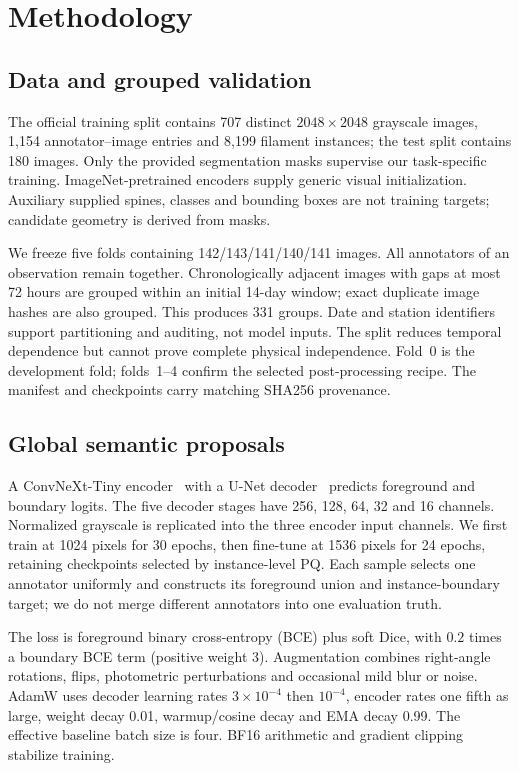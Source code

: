 \documentclass[sigconf]{acmart}
\begin{document}
\section{Methodology}\label{sec:methodology}
\subsection{Data and grouped validation}
The official training split contains 707 distinct $2048\!\times\!2048$ grayscale images, 1,154 annotator--image entries and 8,199 filament instances; the test split contains 180 images. Only the provided segmentation masks supervise our task-specific training. ImageNet-pretrained encoders supply generic visual initialization. Auxiliary supplied spines, classes and bounding boxes are not training targets; candidate geometry is derived from masks.

We freeze five folds containing 142/143/141/140/141 images. All annotators of an observation remain together. Chronologically adjacent images with gaps at most 72 hours are grouped within an initial 14-day window; exact duplicate image hashes are also grouped. This produces 331 groups. Date and station identifiers support partitioning and auditing, not model inputs. The split reduces temporal dependence but cannot prove complete physical independence. Fold~0 is the development fold; folds~1--4 confirm the selected post-processing recipe. The manifest and checkpoints carry matching SHA256 provenance.

\subsection{Global semantic proposals}
A ConvNeXt-Tiny encoder~\cite{convnext} with a U-Net decoder~\cite{unet} predicts foreground and boundary logits. The five decoder stages have 256, 128, 64, 32 and 16 channels. Normalized grayscale is replicated into the three encoder input channels. We first train at 1024 pixels for 30 epochs, then fine-tune at 1536 pixels for 24 epochs, retaining checkpoints selected by instance-level PQ. Each sample selects one annotator uniformly and constructs its foreground union and instance-boundary target; we do not merge different annotators into one evaluation truth.

The loss is foreground binary cross-entropy (BCE) plus soft Dice, with $0.2$ times a boundary BCE term (positive weight 3). Augmentation combines right-angle rotations, flips, photometric perturbations and occasional mild blur or noise. AdamW uses decoder learning rates $3\!\times\!10^{-4}$ then $10^{-4}$, encoder rates one fifth as large, weight decay 0.01, warmup/cosine decay and EMA decay 0.99. The effective baseline batch size is four. BF16 arithmetic and gradient clipping stabilize training.
\end{document}

